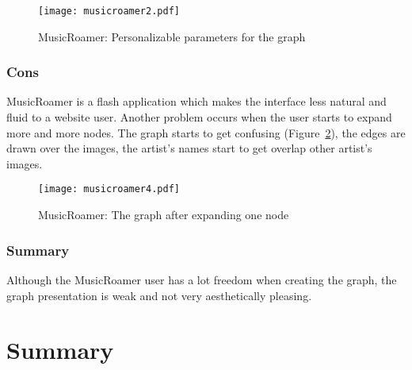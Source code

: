       \begin{figure}[H]
        \begin{center}
          \texttt{[image: musicroamer2.pdf]}
        \end{center}
        \caption{MusicRoamer: Personalizable parameters for the graph }
        \label{fig:sota_musicroamer3}
      \end{figure}


    \subsubsection{Cons} %
    \label{ssub:cons}

      MusicRoamer is a flash application which makes the interface less natural and fluid to a website user.
      Another problem occurs when the user starts to expand more and more nodes.
      The graph starts to get confusing (Figure~\ref{fig:sota_musicroamer4}), the edges are drawn over the images, the artist's names start to get overlap other artist's images.

      \begin{figure}
        \begin{center}
          \texttt{[image: musicroamer4.pdf]}
        \end{center}
        \caption{MusicRoamer: The graph after expanding one node}
        \label{fig:sota_musicroamer4}
      \end{figure}


    \subsubsection{Summary} %
    \label{ssub:summary}

      Although the MusicRoamer user has a lot freedom when creating the graph, the graph presentation is weak and not very aesthetically pleasing.



  \clearpage




\section{Summary}

